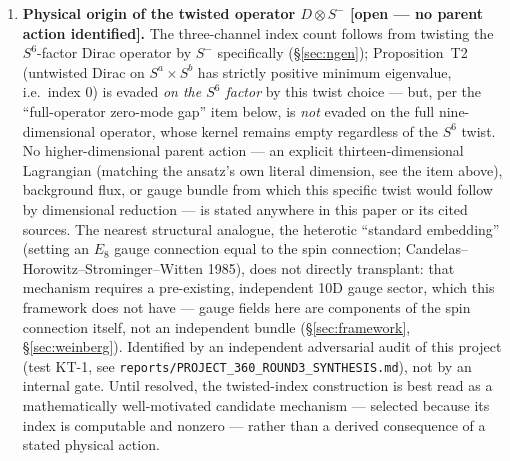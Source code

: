 \documentclass[12pt,a4paper]{article}
\begin{document}
\begin{enumerate}
\item \textbf{Physical origin of the twisted operator $D\otimes S^-$ [open --- no parent
  action identified].} The three-channel index count follows from twisting the
  $S^6$-factor Dirac operator by $S^-$ specifically (\S\ref{sec:ngen}); Proposition~T2
  (untwisted Dirac on $S^a\times S^b$ has strictly positive minimum eigenvalue, i.e.\
  index $0$) is evaded \emph{on the $S^6$ factor} by this twist choice --- but, per
  the ``full-operator zero-mode gap'' item below, is \emph{not} evaded on the full
  nine-dimensional operator, whose kernel remains empty regardless of the $S^6$
  twist. No higher-dimensional parent
  action --- an explicit thirteen-dimensional Lagrangian (matching the ansatz's own
  literal dimension, see the item above), background flux, or gauge bundle from which
  this specific twist would follow by dimensional reduction --- is stated anywhere in
  this paper or its cited sources. The nearest structural analogue, the heterotic
  ``standard embedding'' (setting an $E_8$ gauge connection equal to the spin connection;
  Candelas--Horowitz--Strominger--Witten 1985), does not directly transplant: that
  mechanism requires a pre-existing, independent 10D gauge sector, which this framework
  does not have --- gauge fields here are components of the spin connection itself, not
  an independent bundle (\S\ref{sec:framework}, \S\ref{sec:weinberg}). Identified by an
  independent adversarial audit of this project (test KT-1, see
  \texttt{reports/PROJECT\_360\_ROUND3\_SYNTHESIS.md}), not by an internal gate. Until
  resolved, the twisted-index construction is best read as a mathematically
  well-motivated candidate mechanism --- selected because its index is computable and
  nonzero --- rather than a derived consequence of a stated physical action.


\end{enumerate}
\end{document}
